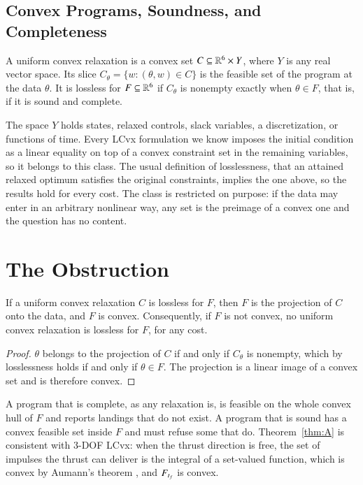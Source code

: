 \subsection{Convex Programs, Soundness, and Completeness}
\begin{definition}\label{def:program}
A uniform convex relaxation is a convex set $C\subseteq\mathbb{R}^6\times Y$, where $Y$ is any real vector space. Its slice
$C_\theta=\{w:(\theta,w)\in C\}$ is the feasible set of the program at the data $\theta$. It is lossless for
$F\subseteq\mathbb{R}^6$ if $C_\theta$ is nonempty exactly when $\theta\in F$, that is, if it is sound and complete.
\end{definition}
The space $Y$ holds states, relaxed controls, slack variables, a discretization, or functions of time. Every LCvx
formulation we know imposes the initial condition as a linear equality on top of a convex constraint set in the remaining
variables, so it belongs to this class. The usual definition of losslessness, that an attained relaxed optimum satisfies the
original constraints, implies the one above, so the results hold for every cost. The class is restricted on purpose: if the
data may enter in an arbitrary nonlinear way, any set is the preimage of a convex one and the question has no content.

\section{The Obstruction}\label{sec:obstruction}
\begin{theorem}\label{thm:A}
If a uniform convex relaxation $C$ is lossless for $F$, then $F$ is the projection of $C$ onto the data, and $F$ is convex.
Consequently, if $F$ is not convex, no uniform convex relaxation is lossless for $F$, for any cost.
\end{theorem}
\begin{proof}
$\theta$ belongs to the projection of $C$ if and only if $C_\theta$ is nonempty, which by losslessness holds if and only if
$\theta\in F$. The projection is a linear image of a convex set and is therefore convex.
\end{proof}
A program that is complete, as any relaxation is, is feasible on the whole convex hull of $F$ and reports landings that do
not exist. A program that is sound has a convex feasible set inside $F$ and must refuse some that do. Theorem~\ref{thm:A} is
consistent with 3-DOF LCvx: when the thrust direction is free, the set of impulses the thrust can deliver is the integral of
a set-valued function, which is convex by Aumann's theorem \cite{aumann1965}, and $F_{t_f}$ is convex.

